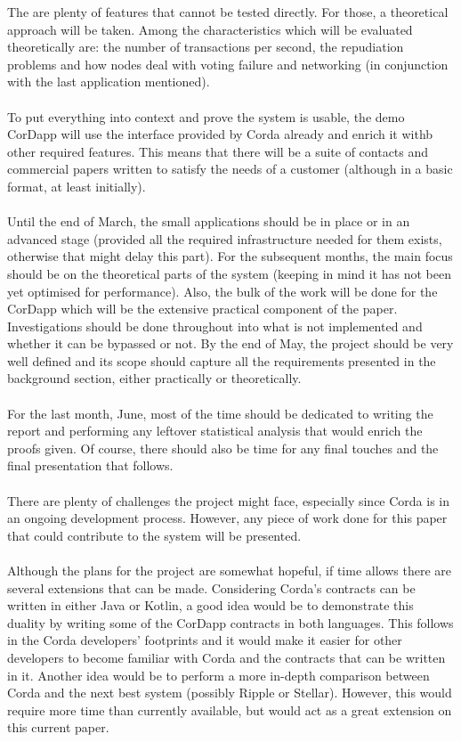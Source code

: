 \documentclass[12pt,twoside]{article}
\begin{document}
The are plenty of features that cannot be tested directly. For those, a theoretical approach will be taken. Among the characteristics which will be evaluated theoretically are: the number of transactions per second, the repudiation problems and how nodes deal with voting failure and networking (in conjunction with the last application mentioned).
\\ \\
To put everything into context and prove the system is usable, the demo CorDapp will use the interface provided by Corda already and enrich it withb other required features. This means that there will be a suite of contacts and commercial papers written to satisfy the needs of a customer (although in a basic format, at least initially). 
\\ \\
Until the end of March, the small applications should be in place or in an advanced stage (provided all the required infrastructure needed for them exists, otherwise that might delay this part). For the subsequent months, the main focus should be on the theoretical parts of the system (keeping in mind it has not been yet optimised for performance). Also, the bulk of the work will be done for the CorDapp which will be the extensive practical component of the paper. Investigations should be done throughout into what is not implemented and whether it can be bypassed or not. By the end of May, the project should be very well defined and its scope should capture all the requirements presented in the background section, either practically or theoretically. 
\\ \\
For the last month, June, most of the time should be dedicated to writing the report and performing any leftover statistical analysis that would enrich the proofs given. Of course, there should also be time for any final touches and the final presentation that follows. 
\\ \\
There are plenty of challenges the project might face, especially since Corda is in an ongoing development process. However, any piece of work done for this paper that could contribute to the system will be presented. 
\\ \\
Although the plans for the project are somewhat hopeful, if time allows there are several extensions that can be made. Considering Corda's contracts can be written in either Java or Kotlin, a good idea would be to demonstrate this duality by writing some of the CorDapp contracts in both languages. This follows in the Corda developers' footprints and it would make it easier for other developers to become familiar with Corda and the contracts that can be written in it. Another idea would be to perform a more in-depth comparison between Corda and the next best system (possibly Ripple or Stellar). However, this would require more time than currently available, but would act as a great extension on this current paper.
\newpage
\end{document}
